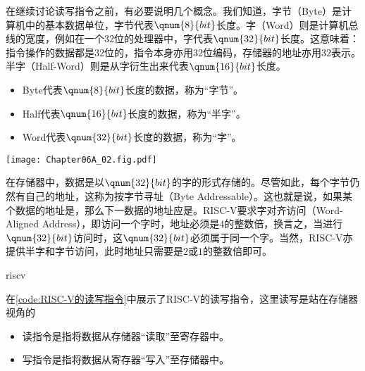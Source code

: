 在继续讨论读写指令之前，有必要说明几个概念。我们知道，字节（Byte）是计算机中的基本数据单位，字节代表$\qnum{8}{bit}$长度。字（Word）则是计算机总线的宽度，例如在一个32位的处理器中，字代表$\qnum{32}{bit}$长度。这意味着：指令操作的数据都是$32$位的，指令本身亦用$32$位编码，存储器的地址亦用$32$表示。半字（Half-Word）则是从字衍生出来代表$\qnum{16}{bit}$长度。

\begin{itemize}
    \item Byte代表$\qnum{8}{bit}$长度的数据，称为“字节”。
    \item Half代表$\qnum{16}{bit}$长度的数据，称为“半字”。
    \item Word代表$\qnum{32}{bit}$长度的数据，称为“字”。
\end{itemize}

\begin{Figure}[存储器读写示意]
    \texttt{[image: Chapter06A\_02.fig.pdf]}
\end{Figure}

在存储器中，数据是以$\qnum{32}{bit}$的字的形式存储的。尽管如此，每个字节仍然有自己的地址，这称为按字节寻址（Byte Addressable）。这也就是说，如果某个数据的地址是，那么下一数据的地址应是。RISC-V要求字对齐访问（Word-Aligned Address），即访问一个字时，地址必须是$4$的整数倍，换言之，当进行$\qnum{32}{bit}$访问时，这$\qnum{32}{bit}$必须属于同一个字。当然，RISC-V亦提供半字和字节访问，此时地址只需要是$2$或$1$的整数倍即可。

\begin{Code}{riscv}
    
\end{Code}

在\cref{code:RISC-V的读写指令}中展示了RISC-V的读写指令，这里读写是站在存储器视角的
\begin{itemize}
    \item 读指令是指将数据从存储器“读取”至寄存器中。
    \item 写指令是指将数据从寄存器“写入”至存储器中。
\end{itemize}


